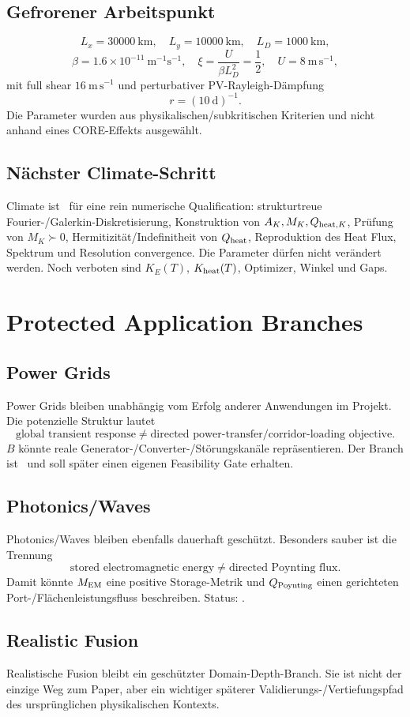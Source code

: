 \subsection{Gefrorener Arbeitspunkt}
\[
L_x=30000\ \mathrm{km},
\quad
L_y=10000\ \mathrm{km},
\quad
L_D=1000\ \mathrm{km},
\]
\[
\beta=1.6\times10^{-11}\ \mathrm{m^{-1}s^{-1}},
\quad
\xi=\frac{U}{\beta L_D^2}=\frac12,
\quad
U=8\ \mathrm{m\,s^{-1}},
\]
mit full shear $16\ \mathrm{m\,s^{-1}}$ und perturbativer PV-Rayleigh-Dämpfung
\[
r=(10\ \mathrm d)^{-1}.
\]
Die Parameter wurden aus physikalischen/subkritischen Kriterien und nicht anhand eines CORE-Effekts ausgewählt.

\subsection{Nächster Climate-Schritt}
Climate ist \ACTIVE\ für eine rein numerische Qualification: strukturtreue Fourier-/Galerkin-Diskretisierung, Konstruktion von $A_K,M_K,Q_{{\rm heat},K}$, Prüfung von $M_K\succ0$, Hermitizität/Indefinitheit von $Q_{\rm heat}$, Reproduktion des Heat Flux, Spektrum und Resolution convergence. Die Parameter dürfen nicht verändert werden. Noch verboten sind $K_E(T)$, $K_{\rm heat}(T)$, Optimizer, Winkel und Gaps.

\section{Protected Application Branches}
\subsection{Power Grids}
Power Grids bleiben unabhängig vom Erfolg anderer Anwendungen im Projekt. Die potenzielle Struktur lautet
\[
\boxed{\text{global transient response}\neq\text{directed power-transfer/corridor-loading objective}.}
\]
$B$ könnte reale Generator-/Converter-/Störungskanäle repräsentieren. Der Branch ist \PARKED\ und soll später einen eigenen Feasibility Gate erhalten.

\subsection{Photonics/Waves}
Photonics/Waves bleiben ebenfalls dauerhaft geschützt. Besonders sauber ist die Trennung
\[
\boxed{\text{stored electromagnetic energy}\neq\text{directed Poynting flux}.}
\]
Damit könnte $M_{\rm EM}$ eine positive Storage-Metrik und $Q_{\rm Poynting}$ einen gerichteten Port-/Flächenleistungsfluss beschreiben. Status: \PARKED.

\subsection{Realistic Fusion}
Realistische Fusion bleibt ein geschützter Domain-Depth-Branch. Sie ist nicht der einzige Weg zum Paper, aber ein wichtiger späterer Validierungs-/Vertiefungspfad des ursprünglichen physikalischen Kontexts.
